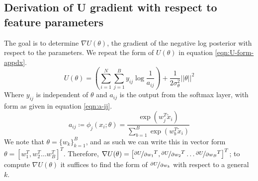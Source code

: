 \documentclass{article}
\begin{document}
\subsection{Derivation of U gradient with respect to feature parameters}
\label{appdx:gradu}
The goal is to determine $\nabla U(\theta)$, the gradient of the negative log posterior with respect to the parameters. We repeat the form of $U(\theta)$ in equation \ref{eqn:U-form-appdx}.
%
\begin{equation}
	U(\theta) = \left( \sum_{i=1}^{N} \sum_{j=1}^{B} y_{ij} \log \frac{1}{a_{ij}} \right)
	+ \frac{1}{2\sigma_\theta^2} ||\theta||^2
	\label{eqn:U-form-appdx}
\end{equation}
%
Where $y_{ij}$ is independent of $\theta$ and $a_{ij}$ is the output from the softmax layer, with form as given in equation \ref{eqn:a-ij}.
%
\begin{equation}
	a_{ij} \coloneqq \phi_{j} (x_i; \theta) = \frac{\exp(w_j^T \tilde{x}_i)}{\sum_{b=1}^{B} \exp(w_b^T \tilde{x}_i)}
	\label{eqn:a-ij} 
\end{equation}
%
We note that $\theta = \{w_k\}_{k=1}^B$, and as such we can write this in vector form $\theta = \left[w_1^T, w_2^T \dots w_B^T  \right]^T$. Therefore, $\nabla U(\theta) = \left[\nicefrac{\partial U}{\partial w_1}^T,\nicefrac{\partial U}{\partial w_2}^T \dots \nicefrac{\partial U}{\partial w_B}^T  \right]^T$; to compute $\nabla U(\theta)$ it suffices to find the form of $\nicefrac{\partial U}{\partial w_k}$ with respect to a general $k$.
\end{document}
